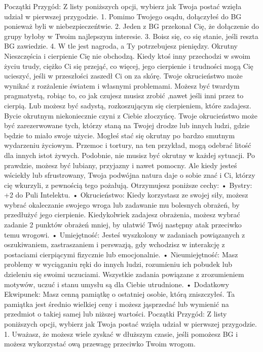 Początki Przygód: Z listy poniższych opcji, wybierz jak Twoja postać wzięła udział w pierwszej przygodzie.
1. Pomimo Twojego osądu, dołączyłeś do BG ponieważ byli w niebezpieczeńtwie.
2. Jeden z BG przekonał Cię, że dołączenie do grupy byłoby w Twoim najlepszym interesie.
3. Boisz się, co się stanie, jeśli reszta BG zawiedzie.
4. W tle jest nagroda, a Ty potrzebujesz pieniędzy.
Okrutny
Nieszczęścia i cierpienie Cię nie obchodzą. Kiedy ktoś inny przechodzi w swoim życiu trudy, ciężko Ci się przejąć, co więcej, jego cierpienie i trudności mogą Cię ucieszyć, jeśli w przeszłości zaszedł Ci on za skórę. Twoje okrucieństwo może wynikać z rozżalenie światem i własnymi problemami. Możesz być twardym pragmatystą, robiąc to, co jak czujesz musisz zrobić ,nawet jeśli inni przez to cierpią. Lub możesz być sadystą, rozkoszującym się cierpieniem, które zadajesz. 
Bycie okrutnym niekoniecznie czyni z Ciebie złoczyńcę. Twoje okrucieństwo może być zarezerwowane tych, którzy staną na Twojej drodze lub innych ludzi, gdzie będzie to miało swoje użycie. Mogłeś stać się okrutny po bardzo smutnym wydarzeniu życiowym. Przemoc i tortury, na ten przykład, mogą odebrać litość dla innych istot żywych.
Podobnie, nie musisz być okrutny w każdej sytuacji. Po prawdzie, możesz być lubiany, przyjazny i nawet pomocny. Ale kiedy jesteś wściekły lub sfrustrowany, Twoja podwójna natura daje o sobie znać i Ci, którzy cię wkurzyli, z pewnością tego pożałują.
Otrzymujesz poniższe cechy:
    • Bystry: +2 do Puli Intelektu.
    • Okrucieństwo: Kiedy korzystasz ze swojej siły, możesz wybrać okaleczanie swojego wroga lub zadawanie mu bolesnych obrażeń, by przedłużyć jego cierpienie. Kiedykolwiek zadajesz obrażenia, możesz wybrać zadanie 2 punktów obrażeń mniej, by ułatwić Twój następny atak przeciwko temu wrogowi.
    • Umiejętność: Jesteś wyszkolony w zadaniach powiązanych z oszukiwaniem, zastraszaniem i perswazją, gdy wchodzisz w interakcję z postaciami cierpiącymi fizycznie lub emocjonalnie. 
    • Nieumiejętność: Masz problemy w wyciąganiu ręki do innych ludzi, rozumieniu ich pobudek lub dzieleniu się swoimi uczuciami. Wszystkie zadania powiązane z zrozumieniem motywów, uczuć i stanu umysłu są dla Ciebie utrudnione.
    • Dodatkowy Ekwipunek: Masz cenną pamiątkę o ostatniej osobie, którą zniszczyłeś. Ta pamiątka jest średnio wielkiej ceny i możesz jąsprzedać lub wymienić na przedmiot o takiej samej lub niższej wartości.
Początki Przygód: Z listy poniższych opcji, wybierz jak Twoja postać wzięła udział w pierwszej przygodzie.
1. Uważasz, że możesz wiele zyskać w dłuższym czasie, jeśli pomożesz BG i możesz wykorzystać ową przewagę przeciwko Twoim wrogom.
